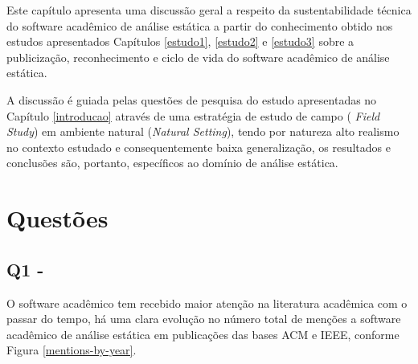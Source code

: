 \label{discussao}


Este capítulo apresenta uma discussão geral a respeito da sustentabilidade
técnica do software acadêmico de análise estática a partir do conhecimento
obtido nos estudos apresentados Capítulos \ref{estudo1}, \ref{estudo2} e
\ref{estudo3} sobre a publicização, reconhecimento e ciclo de vida do software
acadêmico de análise estática.

A discussão é guiada pelas questões de pesquisa do estudo apresentadas no
Capítulo \ref{introducao} através de uma estratégia de estudo de campo ({\it
Field Study}) em ambiente natural ({\it Natural Setting}), tendo por natureza
alto realismo no contexto estudado e consequentemente baixa generalização, os
resultados e conclusões são, portanto, específicos ao domínio de análise
estática.

\section{Questões} 

\subsection{Q1 - \QuestaoUm} %

O software acadêmico tem recebido maior atenção na literatura acadêmica com o
passar do tempo, há uma clara evolução no número total de menções a software
acadêmico de análise estática em publicações das bases ACM e IEEE, conforme
Figura \ref{mentions-by-year}.

